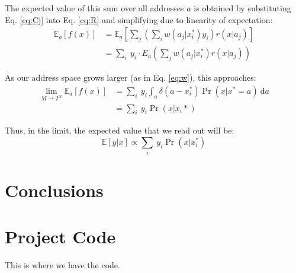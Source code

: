 \documentclass[10pt,letterpaper]{article}
\begin{document}
The expected value of this sum over all addresses $a$ is obtained by
substituting Eq. \ref{eq:Cj} into Eq. \ref{eq:R} and simplifying due
to linearity of expectation:
\begin{align}
\mathbb{E}_a[f(x)]&=\mathbb{E}_a\left[\sum_j\left(\sum_i w(a_j| x_i^*)y_i\right)r(x|a_j)\right]\\
&=\sum_i\ y_i\cdot E_a\left(\sum_j w(a_j| x_i^*)r(x|a_j)\right)
\end{align}

As our address space grows larger (as in Eq. \ref{eq:w}), this approaches:
\begin{align}
\lim_{M\rightarrow 2^N} \mathbb{E}_a[f(x)]&=\sum_i\ y_i \int_a \delta(a-x_i^*)\Pr(x|x^*=a)\ \mathrm{d}a\\
&= \sum_i\ y_i\Pr(x|x_i*)
\end{align}

Thus, in the limit, the expected value that we read out will be:
\begin{equation}
\mathbb{E}[y|x]\propto \sum_i\ y_i\Pr(x|x_i^*)
\end{equation}



\section{Conclusions}



\newpage


\setlength{\bibleftmargin}{.125in}
\setlength{\bibindent}{-\bibleftmargin}




\newpage
\appendix

\section{Project Code}
This is where we have the code.
\end{document}
